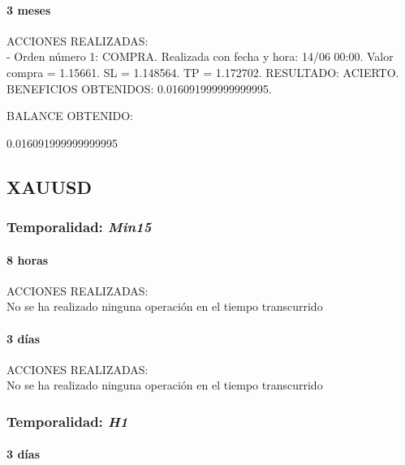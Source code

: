 \paragraph{3 meses}

ACCIONES REALIZADAS:\\

- Orden número 1: COMPRA. Realizada con fecha y hora: 14/06 00:00. Valor compra = 1.15661. SL = 1.148564. TP = 1.172702. RESULTADO: ACIERTO. BENEFICIOS OBTENIDOS: 0.016091999999999995.\newline

\color{blue}
BALANCE OBTENIDO:\newline

0.016091999999999995\newline
\color{black}





\subsection{XAUUSD}

\subsubsection{Temporalidad: \textit{Min15}}

\paragraph{8 horas}

ACCIONES REALIZADAS:\\

No se ha realizado ninguna operación en el tiempo transcurrido

\paragraph{3 días}

ACCIONES REALIZADAS:\\

No se ha realizado ninguna operación en el tiempo transcurrido

\subsubsection{Temporalidad: \textit{H1}}

\paragraph{3 días}

